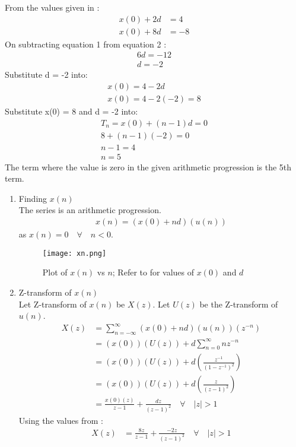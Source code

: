 \documentclass[journal,12pt,twocolumn]{IEEEtran}
\theoremstyle{remark}
\begin{document}
From the values given in :
\begin{align}
    x(0) + 2d &= 4\\
    x(0) + 8d &= -8
\end{align}
On subtracting equation 1 from equation 2 :
\begin{align}
6d = -12 \\
d = -2 
\end{align}
Substitute d = -2 into:
\begin{align}
x(0) = 4 - 2d\\
x(0) = 4 - 2(-2) = 8
\end{align}
Substitute x(0) = 8 and d = -2 into:
\begin{align}
T_n = x(0) + (n-1)d = 0 \\
8 + (n-1)(-2) = 0 \\
n - 1 = 4 \\
n = 5
\end{align}
The term where the value is zero in the given arithmetic progression is the 5th term.\\
\begin{enumerate}
\item Finding $x(n)$ \\
The series is an arithmetic progression.
\begin{align}
x(n) = (x(0) + nd)(u(n))
\end{align}
as $x(n) = 0 \quad \forall \quad n < 0$.
\begin{figure}[h!]
    \centering
    \texttt{[image: xn.png]}
    \caption{Plot of $x(n)$ vs $n$; Refer to  for values of $x(0)$ and $d$}
    \label{fig:1}
\end{figure}
\item Z-transform of $x(n)$ \\
Let Z-transform of $x(n)$ be $X(z)$. Let $U(z)$ be the Z-transform of $u(n)$.
\begin{align}
X(z) &= \sum_{n = -\infty}^{\infty} (x(0) + nd)(u(n))(z^{-n}) \\
&= (x(0))(U(z)) + d\sum_{n = 0}^{\infty}nz^{-n} \\
&= (x(0))(U(z)) + d(\frac{z^{-1}}{(1 - z^{-1})^2}) \\
&= (x(0))(U(z)) + d(\frac{z}{(z - 1)^2}) \\
&= \frac{x(0)(z)}{z - 1} + \frac{dz}{(z - 1)^2} \quad \forall \quad |z| > 1
\end{align}
Using the values from :
\begin{align}
X(z) &= \frac{8z}{z - 1} + \frac{-2z}{(z - 1)^2} \quad \forall \quad |z| > 1
\end{align}
\end{enumerate}
\end{document}
